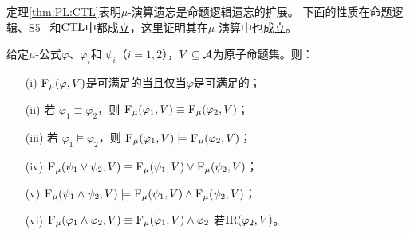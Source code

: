 定理\ref{thm:PL:CTL}表明$\mu$-演算遗忘是命题逻辑遗忘的扩展。
下面的性质在命题逻辑、S5~\cite{Yan:AIJ:2009} 和$\textrm{CTL}$中都成立，这里证明其在$\mu$-演算中也成立。
\begin{proposition}
	\label{chapter06:pro:ctl:forget:1}
	给定$\mu$-公式$\varphi$、$\varphi_i$和 $\psi_i$（$i=1,2$），$V\subseteq {\cal A}$为原子命题集。则：
	\begin{itemize}
		\item[(i)] ${\textsc{F}_{\textsc{$\mu$}}}(\varphi, V)$是可满足的当且仅当$\varphi$是可满足的；
		\item[(ii)] 若 $\varphi_1 \equiv \varphi_2$，则 ${\textsc{F}_{\textsc{$\mu$}}}(\varphi_1, V) \equiv {\textsc{F}_{\textsc{$\mu$}}}(\varphi_2, V)$；
		\item[(iii)] 若 $\varphi_1 \models \varphi_2$，则 ${\textsc{F}_{\textsc{$\mu$}}}(\varphi_1, V) \models {\textsc{F}_{\textsc{$\mu$}}}(\varphi_2, V)$；
		\item[(iv)] ${\textsc{F}_{\textsc{$\mu$}}}(\psi_1 \vee \psi_2, V) \equiv {\textsc{F}_{\textsc{$\mu$}}}(\psi_1, V) \vee {\textsc{F}_{\textsc{$\mu$}}}(\psi_2, V)$；
		\item[(v)] ${\textsc{F}_{\textsc{$\mu$}}}(\psi_1 \wedge \psi_2, V) \models {\textsc{F}_{\textsc{$\mu$}}}(\psi_1, V) \wedge {\textsc{F}_{\textsc{$\mu$}}}(\psi_2, V)$；
		\item[(vi)] ${\textsc{F}_{\textsc{$\mu$}}}(\varphi_1 \wedge \varphi_2, V) \equiv {\textsc{F}_{\textsc{$\mu$}}}(\varphi_1, V) \wedge \varphi_2$ 若$\textrm{IR}(\varphi_2, V)$。
	\end{itemize}
\end{proposition}
